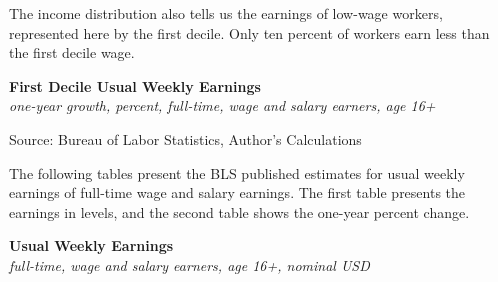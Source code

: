 \documentclass{report}
\makeatletter
\newcommand{\tbllink}[1]{\href{https://raw.githubusercontent.com/bdecon/US-chartbook/master/chartbook/data/#1}{\faTable}}
\newcommand*\short[1]{\expandafter\@gobbletwo\number\numexpr#1\relax}
\newcommand{\dateaxisticks}{
		date coordinates in=x, axis line style={draw=none},
		xmax={2023-11-30},
		max space between ticks=40,	    
		xtick={{1990-01-01}, {1992-01-01}, {1994-01-01}, 
			{1996-01-01}, {1998-01-01}, {2000-01-01}, 
			{2002-01-01}, {2004-01-01}, {2006-01-01},
			{2008-01-01}, {2010-01-01}, {2012-01-01}, {2014-01-01},
		    {2016-01-01}, {2018-01-01}, {2020-01-01}, {2022-01-01}, 
		    {2024-01-01}, {2026-01-01}},
		minor xtick={{1989-01-01}, {1991-01-01}, {1993-01-01},
			{1995-01-01}, {1997-01-01}, {1999-01-01}, 
			{2001-01-01}, {2003-01-01}, {2005-01-01}, {2007-01-01},
		    {2009-01-01}, {2011-01-01}, {2013-01-01}, {2015-01-01},
		    {2017-01-01}, {2019-01-01}, {2021-01-01}, {2023-01-01}, 
		    {2025-01-01}, {2027-01-01}},
		enlarge y limits={0.06}, enlarge x limits={0.01},
		xticklabel style={align=center, yshift=-2pt}, tick label style={inner sep=0pt},
		}
\newcommand{\bbar}[2]{extra #1 ticks = {{#2}}, extra #1 tick labels = ,
		extra #1 tick style = {grid=major, grid style={thick, black!25}},}
\newcommand{\thinline}[4]{\addplot[no markers, color=#1] 
		table [x=#2, y=#3, col sep=comma] {#4};	}
\newcommand{\thickline}[4]{\addplot[ultra thick, no markers, color=#1] 
		table [x=#2, y=#3, col sep=comma] {#4};	}
\newcommand{\rbars}{
		\fill[color=black!10] (axis cs:{1990-07-01},\pgfkeysvalueof{/pgfplots/ymin}) rectangle 
			(axis cs:{1991-03-01}, \pgfkeysvalueof{/pgfplots/ymax});
		\fill[color=black!10] (axis cs:{2007-12-01},\pgfkeysvalueof{/pgfplots/ymin}) rectangle 
			(axis cs:{2009-07-01}, \pgfkeysvalueof{/pgfplots/ymax});
		\fill[color=black!10] (axis cs:{2001-03-01},\pgfkeysvalueof{/pgfplots/ymin}) rectangle 
			(axis cs:{2001-11-01}, \pgfkeysvalueof{/pgfplots/ymax});
		\fill[color=black!10] (axis cs:{2020-02-01},\pgfkeysvalueof{/pgfplots/ymin}) rectangle 
			(axis cs:{2020-05-01}, \pgfkeysvalueof{/pgfplots/ymax});}
\makeatother
\begin{document}
{\begin{minipage}{0.76\textwidth}   
\small The income distribution also tells us the earnings of low-wage workers, represented here by the first decile. Only ten percent of workers earn less than the first decile wage. 
\vspace{1mm}

\normalsize \textbf{First Decile Usual Weekly Earnings}\\
\footnotesize{\textit{one-year growth, percent, full-time, wage and salary earners, age 16+}}
\vspace{2.8cm}

\hspace{2mm} 

\footnotesize{Source: Bureau of Labor Statistics, Author's Calculations} \hfill \tbllink{uwe_bls_gr.csv} \ \ \tbllink{uwe_cps.csv}
\vspace{2mm}

\small The following tables present the BLS published estimates for usual weekly earnings of full-time wage and salary earnings. The first table presents the earnings in levels, and the second table shows the one-year percent change.
\vspace{2mm}

\normalsize \textbf{Usual Weekly Earnings}\\
\footnotesize{\textit{full-time, wage and salary earners, age 16+, nominal USD}}\\
 \setlength{\tabcolsep}{3.1pt} \color{black!90}
		{\renewcommand{\arraystretch}{1.55}
		 \begin{tabular}{p{17mm} R{8.8mm} R{8.8mm} R{8.8mm} R{8.8mm} R{8.8mm} R{8.8mm} 
		   R{8.8mm} R{8.8mm} R{8.8mm} R{8.8mm}}
			  \hline
		\end{tabular}}
\vspace{-3mm}
		

\end{minipage}}
\end{document}

